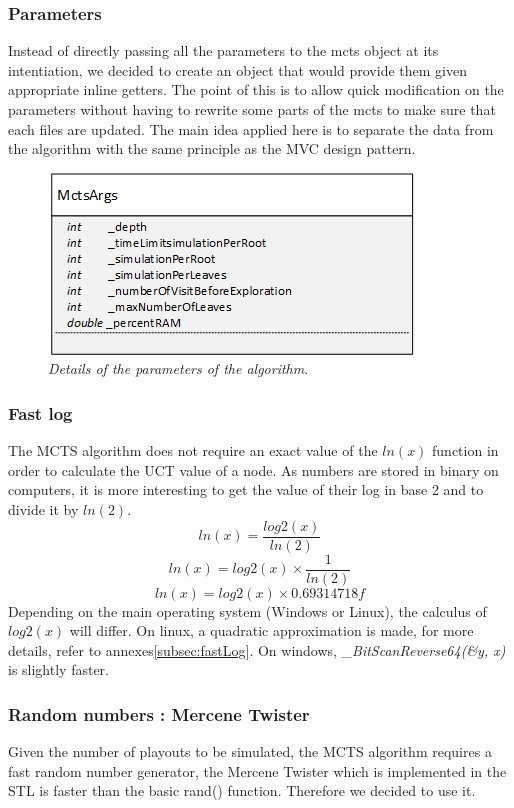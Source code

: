 \subsubsection{Parameters}
Instead of directly passing all the parameters to the mcts object at its intentiation, we decided to create an object that would provide them given appropriate inline getters. The point of this is to allow quick modification on the parameters without having to rewrite some parts of the mcts to make sure that each files are updated. The main idea applied here is to separate the data from the algorithm with the same principle as the MVC design pattern.
\begin{figure}[H] 
\centerline{\includegraphics[scale=0.8]{Data_Structure/Img/MctsArgs.png}}
\caption{\label{fig:mctsargsuml}\textit{Details of the parameters of the algorithm}.}
\end{figure}

\subsubsection{Fast log}
The MCTS algorithm does not require an exact value of the \ensuremath{ln(x)} function in order to calculate the UCT value of a node. As numbers are stored in binary on computers, it is more interesting to get the value of their log in base 2 and to divide it by \ensuremath{ln(2)}. 
\begin{equation}
ln(x) = \frac{log2(x)}{ln(2)}
\end{equation}
\begin{equation}
ln(x) = log2(x) \times \frac{1}{ln(2)}
\end{equation}
\begin{equation}
ln(x) = log2(x) \times 0.69314718f
\end{equation}
Depending on the main operating system (Windows or Linux), the calculus of \ensuremath{log2(x)} will differ. On linux, a quadratic approximation is made, for more details, refer to annexes\ref{subsec:fastLog}. On windows, \textit{\_BitScanReverse64(\&y, x)} is slightly faster. 

\subsubsection{Random numbers : Mercene Twister}
Given the number of playouts to be simulated, the MCTS algorithm requires a fast random number generator, the Mercene Twister which is implemented in the STL is faster than the basic rand() function. Therefore we decided to use it.


